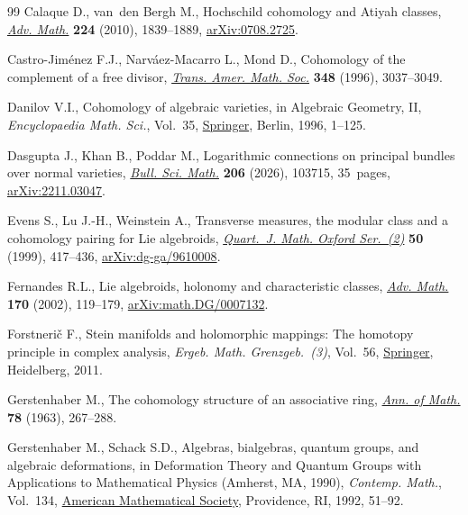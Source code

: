 \documentclass[pdftex]{sigma}
\numberwithin{equation}{section}
\theoremstyle{definition}
\begin{document}
\begin{thebibliography}{99}
Calaque D., van~den Bergh M., Hochschild cohomology and {A}tiyah classes,
 \href{https://doi.org/10.1016/j.aim.2010.01.012}{\textit{Adv. Math.}}
 \textbf{224} (2010), 1839--1889,
 \href{http://arxiv.org/abs/0708.2725}{arXiv:0708.2725}.

Castro-Jim\'enez F.J., Narv\'{a}ez-Macarro L., Mond D., Cohomology of the
 complement of a free divisor,
 \href{https://doi.org/10.1090/S0002-9947-96-01690-X}{\textit{Trans. Amer.
 Math. Soc.}} \textbf{348} (1996), 3037--3049.

Danilov V.I., Cohomology of algebraic varieties, in Algebraic Geometry, {II},
 \textit{Encyclopaedia Math. Sci.}, Vol.~35,
 \href{https://doi.org/10.1007/978-3-642-60925-1_1}{Springer}, Berlin, 1996,
 1--125.

Dasgupta J., Khan B., Poddar M., Logarithmic connections on principal bundles
 over normal varieties,
 \href{https://doi.org/10.1016/j.bulsci.2025.103715}{\textit{Bull. Sci.
 Math.}} \textbf{206} (2026), 103715, 35~pages,
 \href{http://arxiv.org/abs/2211.03047}{arXiv:2211.03047}.

Evens S., Lu J.-H., Weinstein A., Transverse measures, the modular class and a
 cohomology pairing for {L}ie algebroids,
 \href{https://doi.org/10.1093/qjmath/50.200.417}{\textit{Quart.~J. Math.
 Oxford Ser.~(2)}} \textbf{50} (1999), 417--436,
 \href{http://arxiv.org/abs/dg-ga/9610008}{arXiv:dg-ga/9610008}.

Fernandes R.L., Lie algebroids, holonomy and characteristic classes,
 \href{https://doi.org/10.1006/aima.2001.2070}{\textit{Adv. Math.}}
 \textbf{170} (2002), 119--179,
 \href{http://arxiv.org/abs/math.DG/0007132}{arXiv:math.DG/0007132}.

Forstneri\v{c} F., Stein manifolds and holomorphic mappings: {T}he homotopy
 principle in complex analysis, \textit{Ergeb. Math. Grenzgeb.~(3)}, Vol.~56,
 \href{https://doi.org/10.1007/978-3-642-22250-4}{Springer}, Heidelberg, 2011.

Gerstenhaber M., The cohomology structure of an associative ring,
 \href{https://doi.org/10.2307/1970343}{\textit{Ann. of Math.}} \textbf{78}
 (1963), 267--288.

Gerstenhaber M., Schack S.D., Algebras, bialgebras, quantum groups, and
 algebraic deformations, in Deformation Theory and Quantum Groups with
 Applications to Mathematical Physics ({A}mherst, {MA}, 1990),
 \textit{Contemp. Math.}, Vol.~134,
 \href{https://doi.org/10.1090/conm/134/1187279}{American Mathematical
 Society}, Providence, RI, 1992, 51--92.


\end{thebibliography}
\end{document}
